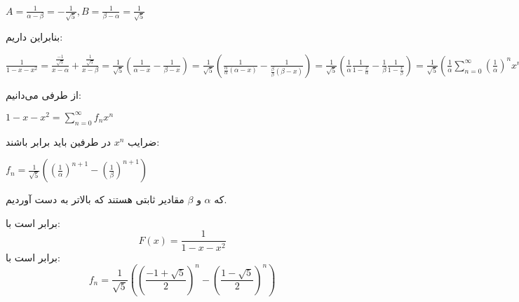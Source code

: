 \begin{enumerate}
\begin{center}
                    $A = \frac{1}{\alpha - \beta} = -\frac{1}{\sqrt{5}}, B = \frac{1}{\beta - \alpha} = \frac{1}{\sqrt{5}}$\\
                \end{center}
                بنابراین داریم:\\
                \begin{center}
                    $\frac{1}{1 - x - x^2} = \frac{\frac{-1}{\sqrt{5}}}{x - \alpha} + \frac{\frac{1}{\sqrt{5}}}{x - \beta} 
                    = \frac{1}{\sqrt{5}}(\frac{1}{\alpha - x} - \frac{1}{\beta - x}) 
                    = \frac{1}{\sqrt{5}}(\frac{1}{ \frac{\alpha}{\alpha}(\alpha - x)} - \frac{1}{ \frac{\beta}{\beta}(\beta - x)})
                    = \frac{1}{\sqrt{5}}(\frac{1}{\alpha}\frac{1}{1 - \frac{x}{\alpha} } - \frac{1}{\beta}\frac{1}{1 - \frac{x}{\beta}}) 
                    = \frac{1}{\sqrt{5}}(\frac{1}{\alpha}\sum_{n = 0}^{\infty} (\frac{1}{\alpha})^nx^n - \frac{1}{\beta}\sum_{n = 0}^{\infty} (\frac{1}{\beta})^nx^n)
                    = \frac{1}{\sqrt{5}}(\sum_{n = 0}^{\infty} (\frac{1}{\alpha}^{n+1} - \frac{1}{\beta}^{n + 1})x^n)$
                \end{center}
                از طرفی می‌دانیم:\\
                \begin{center}
                $1 - x - x^2 = \sum_{n = 0}^{\infty} f_nx^n$\\
                \end{center}
                
                ضرایب $x^n$ در طرفین باید برابر باشند:\\
                \begin{center}
                $f_n = \frac{1}{\sqrt{5}}( (\frac{1}{\alpha})^{n + 1} - (\frac{1}{\beta})^{n + 1}   )$
                \end{center}
                که 
                $\alpha$
                و 
                $\beta$
                مقادیر ثابتی هستند که بالاتر به دست آوردیم.
\end{enumerate}

\begin{THEOREM}
\p
{}
برابر است با:
 $$F(x) = \frac{1}{1 - x - x^2}$$
برابر است با:
$$f_n = \frac{1}{\sqrt{5}}((\frac{-1 + \sqrt{5}}{2})^{n} - (\frac{1 - \sqrt{5}}{2})^{n})$$
\end{THEOREM}
